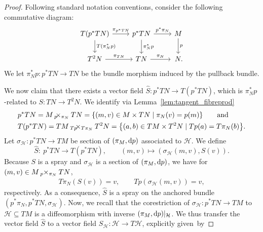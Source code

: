 \documentclass[pdftex]{sigma}
\numberwithin{equation}{section}
\newcommand{\cH}{\ensuremath{\mathcal{H}}}
\begin{document}
\begin{proof}
Following standard notation conventions, consider the following commutative diagram:
\begin{displaymath}
\begin{tikzcd}
 T(p^{\ast} TN) \arrow[r, "\pi_{p^\ast TN}"] \arrow[d, "T(\pi_N^\ast p)"] & p^\ast TN \arrow[r,"p^\ast \pi_N"] \arrow[d,"\pi_N^\ast p"] & M \arrow[d,"p"] \\ T^2 N \arrow[r,"\pi_{TN}"] & TN \arrow[r,"\pi_N"] & \,N.
\end{tikzcd}
\end{displaymath}
We let $\pi_N^\ast p \colon p^\ast TN \rightarrow TN$ be the bundle morphism induced by the pullback bundle.

We now claim that there exists a vector field $\hat{S}\colon p^{*}TN \rightarrow T(p^{*}TN)$, which is $\pi^{*}_{N}p$-related to $S\colon TN \rightarrow T^{2}N$.
We identify via Lemma~\ref{lem:tangent_fibreprod}
\begin{align*}
 & p^{*}TN= M \, {}_{p}\hspace{-.5em}\times_{\pi_{N}} TN = \{ (m,v) \in M \times TN \mid \pi_{N}(v) = p(m)\} \qquad \text{and} \\
 & T(p^{*}TN)= TM\, {}_{Tp}\hspace{-.5em}\times_{T\pi_{N}} T^{2}N = \bigl\{ (a,b) \in TM \times T^{2}N \mid Tp(a) = T\pi_{N}(b) \bigr\}.
\end{align*}
Let $\sigma_{\mathcal{H}}\colon p^{*}TN \rightarrow TM$ be section of $(\pi_{M}, {\rm d}p)$ associated to $\mathcal{H}$.
We define
\begin{equation*}
 \hat{S}\colon\ p^{*}TN \rightarrow T(p^{*}TN), \qquad (m,v) \mapsto (\sigma_{\mathcal{H}}(m,v), S(v)).
\end{equation*}
Because $S$ is a spray and $\sigma_{\mathcal{H}}$ is a section of $(\pi_{M},{\rm d}p)$, we have for $(m,v) \in M \, {}_{p}\hspace{-.25em}\times_{\pi_{N}} TN$,
\begin{align*}
 T\pi_{N}(S(v)) = v, \qquad
 Tp(\sigma_{\mathcal{H}}(m,v)) = v,
\end{align*}
respectively.
As a consequence, $\hat{S}$ is a spray on the anchored bundle $(p^\ast\pi_N, p^\ast TN, \sigma_{\cH})$.
Now, we recall that the corestriction of $\sigma_\cH \colon p^\ast TN \rightarrow TM$ to $\mathcal{H} \subseteq TM$ is a diffeomorphism with inverse $(\pi_M,{\rm d}p)|_\cH$.
We thus transfer the vector field $\hat{S}$ to a vector field $S_{\mathcal{H}}\colon \mathcal{H} \rightarrow T\mathcal{H}$, explicitly given~by

\end{proof}
\end{document}
